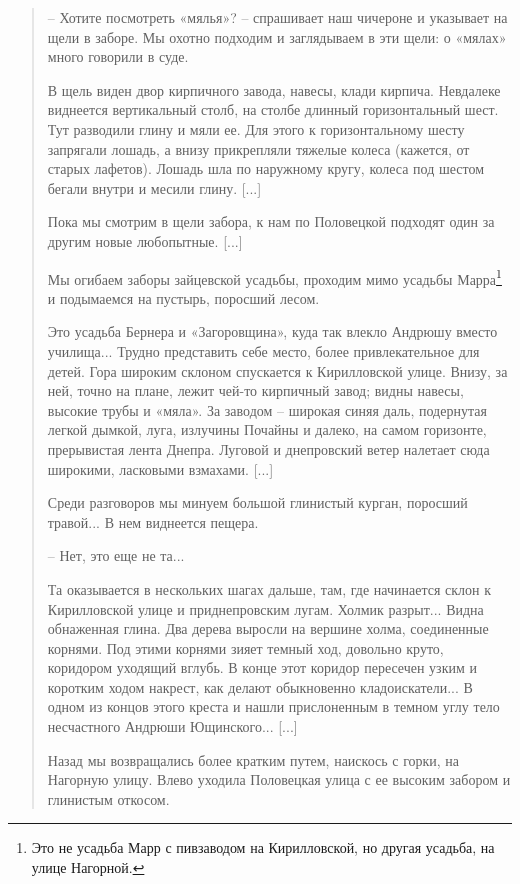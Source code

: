 \begin{quotation}
   – Хотите посмотреть «мялья»? – спрашивает наш чичероне и указывает на щели в заборе. Мы охотно подходим и заглядываем в эти щели: о «мялах» много говорили в суде.

В щель виден двор кирпичного завода, навесы, клади кирпича. Невдалеке виднеется вертикальный столб, на столбе длинный горизонтальный шест. Тут разводили глину и мяли ее. Для этого к горизонтальному шесту запрягали лошадь, а внизу прикрепляли тяжелые колеса (кажется, от старых лафетов). Лошадь шла по наружному кругу, колеса под шестом бегали внутри и месили глину. [...]

Пока мы смотрим в щели забора, к нам по Половецкой подходят один за другим новые любопытные. [...]

Мы огибаем заборы зайцевской усадьбы, проходим мимо усадьбы Марра\footnote{Это не усадьба Марр с пивзаводом на Кирилловской, но другая усадьба, на улице Нагорной.} и подымаемся на пустырь, поросший лесом. 

Это усадьба Бернера и «Загоровщина», куда так влекло Андрюшу вместо училища... Трудно представить себе место, более привлекательное для детей. Гора широким склоном спускается к Кирилловской улице. Внизу, за ней, точно на плане, лежит чей-то кирпичный завод; видны навесы, высокие трубы и «мяла». За заводом – широкая синяя даль, подернутая легкой дымкой, луга, излучины Почайны и далеко, на самом горизонте, прерывистая лента Днепра. Луговой и днепровский ветер налетает сюда широкими, ласковыми взмахами. [...]

Среди разговоров мы минуем большой глинистый курган, поросший травой... В нем виднеется пещера.

  – Нет, это еще не та...

Та оказывается в нескольких шагах дальше, там, где начинается склон к Кирилловской улице и приднепровским лугам. Холмик разрыт... Видна обнаженная глина. Два дерева выросли на вершине холма, соединенные корнями. Под этими корнями зияет темный ход, довольно круто, коридором уходящий вглубь. В конце этот коридор пересечен узким и коротким ходом накрест, как делают обыкновенно кладоискатели... В одном из концов этого креста и нашли прислоненным в темном углу тело несчастного Андрюши Ющинского... [...]

Назад мы возвращались более кратким путем, наискось с горки, на Нагорную улицу. Влево уходила Половецкая улица с ее высоким забором и глинистым откосом.
\end{quotation}


